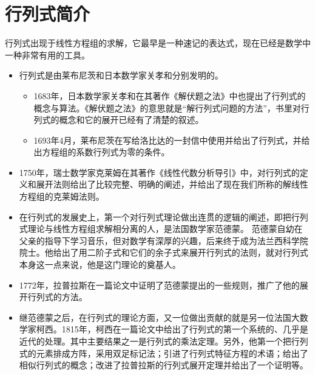 \section{行列式简介}



行列式出现于线性方程组的求解，它最早是一种速记的表达式，现在已经是数学中一种非常有用的工具。
\begin{itemize}
\item 行列式是由莱布尼茨和日本数学家关孝和分别发明的。 
  \begin{itemize}
  \item 1683年，日本数学家关孝和在其著作《解伏题之法》中也提出了行列式的概念与算法。《解伏题之法》的意思就是“解行列式问题的方法”，书里对行列式的概念和它的展开已经有了清楚的叙述。 
  \item 1693年4月，莱布尼茨在写给洛比达的一封信中使用并给出了行列式，并给出方程组的系数行列式为零的条件。

  \end{itemize}
  
\item
  1750年，瑞士数学家克莱姆在其著作《线性代数分析导引》中，对行列式的定义和展开法则给出了比较完整、明确的阐述，并给出了现在我们所称的解线性方程组的克莱姆法则。
\end{itemize}




\begin{itemize}

\item
  在行列式的发展史上，第一个对行列式理论做出连贯的逻辑的阐述，即把行列式理论与线性方程组求解相分离的人，是法国数学家范德蒙。
  范德蒙自幼在父亲的指导下学习音乐，但对数学有深厚的兴趣，后来终于成为法兰西科学院院士。他给出了用二阶子式和它们的余子式来展开行列式的法则，就对行列式本身这一点来说，他是这门理论的奠基人。
  \\[0.1in] 
\item
  1772年，拉普拉斯在一篇论文中证明了范德蒙提出的一些规则，推广了他的展开行列式的方法。 
  
\item
  继范德蒙之后，在行列式的理论方面，又一位做出贡献的就是另一位法国大数学家柯西。1815年，柯西在一篇论文中给出了行列式的第一个系统的、几乎是近代的处理。其中主要结果之一是行列式的乘法定理。另外，他第一个把行列式的元素排成方阵，采用双足标记法；引进了行列式特征方程的术语；给出了相似行列式的概念；改进了拉普拉斯的行列式展开定理并给出了一个证明等。
\end{itemize}




